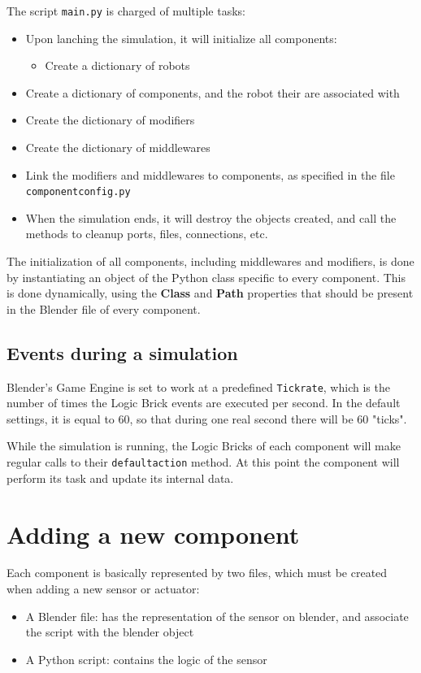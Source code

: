 \documentclass[twoside,a4paper,10pt]{report}
\newcommand{\dokutitlelevelone}[1]{\chapter{#1}}
\newcommand{\dokutitleleveltwo}[1]{\section{#1}}
\newcommand{\dokubold}[1]{\textbf{#1}}
\newcommand{\dokumonospace}[1]{\texttt{#1}}
\newcommand{\dokuitem}{\item}
\begin{document}
The script \dokumonospace{main.py} is charged of multiple tasks:


\begin{itemize}
\dokuitem  Upon lanching the simulation, it will initialize all components:
\begin{itemize}
\dokuitem  Create a dictionary of robots
\end{itemize}

\dokuitem  Create a dictionary of components, and the robot their are associated with
\dokuitem  Create the dictionary of modifiers
\dokuitem  Create the dictionary of middlewares
\dokuitem  Link the modifiers and middlewares to components, as specified in the file \dokumonospace{component{\textunderscore}config.py}
\dokuitem  When the simulation ends, it will destroy the objects created, and call the methods to cleanup ports, files, connections, etc.
\end{itemize}

The initialization of all components, including middlewares and modifiers, is done by instantiating an object of the Python class specific to every component. This is done dynamically, using the \dokubold{Class} and \dokubold{Path} properties that should be present in the Blender file of every component.


\dokutitleleveltwo{Events during a simulation}
\label{fefdb00464c51c19fc057196c0844e71}%

Blender's Game Engine is set to work at a predefined \dokumonospace{Tickrate}, which is the number of times the Logic Brick events are executed per second. In the default settings, it is equal to 60, so that during one real second there will be 60 "ticks".

While the simulation is running, the Logic Bricks of each component will make regular calls to their \dokumonospace{default{\textunderscore}action} method. At this point the component will perform its task and update its internal data.

\dokutitlelevelone{Adding a new component}
\label{d6803cd830a74126c504056aa5dc3942}%
\label{a75d8217092912ac621cdbf4c37d0162}%

Each component is basically represented by two files, which must be created when adding a new sensor or actuator:


\begin{itemize}
\dokuitem  A Blender file: has the representation of the sensor on blender, and associate the script with the blender object
\dokuitem  A Python script: contains the logic of the sensor
\end{itemize}
\end{document}
